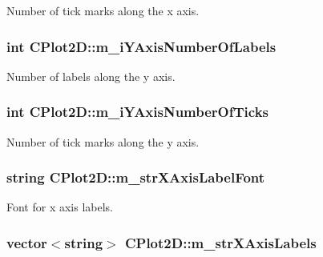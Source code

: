 Number of tick marks along the x axis. \hypertarget{class_c_plot2_d_a52bdf7d7185763803433cd879cc8b9e2}{
\subsubsection[{m\-\_\-i\-Y\-Axis\-Number\-Of\-Labels}]{\setlength{\rightskip}{0pt plus 5cm}int C\-Plot2\-D\-::m\-\_\-i\-Y\-Axis\-Number\-Of\-Labels\hspace{0.3cm}{\ttfamily [protected]}}}\label{class_c_plot2_d_a52bdf7d7185763803433cd879cc8b9e2}
Number of labels along the y axis. \hypertarget{class_c_plot2_d_a74edcbb4ea8bd87bfb8ef341395189cf}{
\subsubsection[{m\-\_\-i\-Y\-Axis\-Number\-Of\-Ticks}]{\setlength{\rightskip}{0pt plus 5cm}int C\-Plot2\-D\-::m\-\_\-i\-Y\-Axis\-Number\-Of\-Ticks\hspace{0.3cm}{\ttfamily [protected]}}}\label{class_c_plot2_d_a74edcbb4ea8bd87bfb8ef341395189cf}
Number of tick marks along the y axis. \hypertarget{class_c_plot2_d_a64ee61caba37d0df489eee5107bab55a}{
\subsubsection[{m\-\_\-str\-X\-Axis\-Label\-Font}]{\setlength{\rightskip}{0pt plus 5cm}string C\-Plot2\-D\-::m\-\_\-str\-X\-Axis\-Label\-Font\hspace{0.3cm}{\ttfamily [protected]}}}\label{class_c_plot2_d_a64ee61caba37d0df489eee5107bab55a}
Font for x axis labels. \hypertarget{class_c_plot2_d_a36fd007d7a5c0864fd0b5fdd3de6d9e3}{
\subsubsection[{m\-\_\-str\-X\-Axis\-Labels}]{\setlength{\rightskip}{0pt plus 5cm}vector$<$string$>$ C\-Plot2\-D\-::m\-\_\-str\-X\-Axis\-Labels\hspace{0.3cm}{\ttfamily [protected]}}}\label{class_c_plot2_d_a36fd007d7a5c0864fd0b5fdd3de6d9e3}
